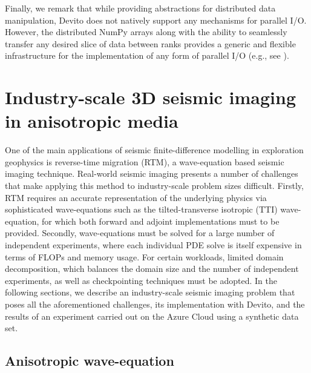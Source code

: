 \documentclass[10pt, conference]{IEEEtran}
\begin{document}
Finally, we remark that while providing abstractions for distributed
data manipulation, Devito
does not natively support any mechanisms for parallel I/O. However, the
distributed NumPy arrays along with the ability to seamlessly transfer any
desired slice of data between ranks provides a generic and flexible
infrastructure for the implementation of any form of parallel I/O
(e.g., see \cite{witte2018alf}).

\section{Industry-scale 3D seismic imaging in anisotropic
media}\label{industry-scale-3d-seismic-imaging-in-anisotropic-media}

One of the main applications of seismic finite-difference modelling in
exploration geophysics is reverse-time migration (RTM), a wave-equation based
seismic imaging technique. Real-world seismic imaging presents a number of
challenges that make applying this method to industry-scale problem sizes
difficult. Firstly, RTM requires an accurate representation of the underlying
physics via sophisticated wave-equations such as the tilted-transverse isotropic
(TTI) wave-equation, for which both forward and adjoint implementations must to
be provided. Secondly, wave-equations must be solved for a large number of
independent experiments, where each individual PDE solve is itself expensive in
terms of FLOPs and memory usage. For certain workloads, limited domain
decomposition, which balances the domain size and the number of independent
experiments, as well as checkpointing techniques must be adopted. In the following
sections, we describe an industry-scale seismic imaging problem that poses all
the aforementioned challenges, its implementation with Devito, and the results
of an experiment carried out on the Azure Cloud using a synthetic data set.

\subsection{Anisotropic wave-equation}\label{anisotropic-wave-equation}
\end{document}
